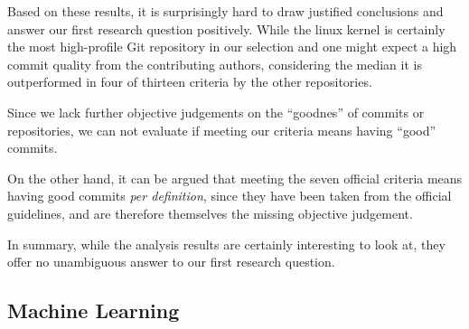 Based on these results, it is surprisingly hard to draw justified conclusions and answer our first research question positively. While the linux kernel is certainly the most high-profile Git repository in our selection and one might expect a high commit quality from the contributing authors, considering the median it is outperformed in four of thirteen criteria by the other repositories.

Since we lack further objective judgements on the ``goodnes'' of commits or repositories, we can not evaluate if meeting our criteria means having ``good'' commits.

On the other hand, it can be argued that meeting the seven official criteria means having good commits \emph{per definition}, since they have been taken from the official guidelines, and are therefore themselves the missing objective judgement.

In summary, while the analysis results are certainly interesting to look at, they offer no unambiguous answer to our first research question.

\subsection{Machine Learning}
\label{sec:results2}


%
%
